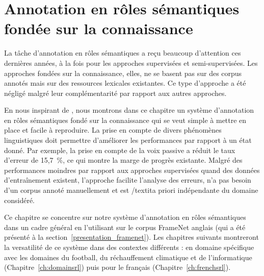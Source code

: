 \chapter{Annotation en rôles sémantiques fondée sur la connaissance}
\label{ch:srl}




La tâche d'annotation en rôles sémantiques a reçu beaucoup d'attention ces
dernières années, à la fois pour les approches supervisées et semi-supervisées.
Les approches fondées sur la connaissance, elles, ne se basent pas sur des
corpus annotés mais sur des ressources lexicales existantes. Ce type d'approche
a été négligé malgré leur complémentarité par rapport aux autres approches.

En nous inspirant de \citep{swier2004unsupervised,swier2005exploiting}, nous
montrons dans ce chapitre un système d'annotation en rôles sémantiques fondé
sur la connaissance qui se veut simple à mettre en place et facile à
reproduire. La prise en compte de divers phénomènes linguistiques doit
permettre d'améliorer les performances par rapport à un état donné. Par
exemple, la prise en compte de la voix passive a réduit le taux d'erreur de
15,7~\%, ce qui montre la marge de progrès existante. Malgré des performances
moindres par rapport aux approches supervisées quand des données d'entraînement
existent, l'approche facilite l'analyse des erreurs, n'a pas besoin d'un corpus
annoté manuellement et est /textit{a priori} indépendante du domaine considéré.

Ce chapitre se concentre sur notre système d'annotation en rôles sémantiques
dans un cadre général en l'utilisant sur le corpus FrameNet anglais (qui a été
présenté à la section~\ref{presentation_framenet}). Les chapitres suivants
montreront la versatilité de ce système dans des contextes différents : en
domaine spécifique avec les domaines du football, du réchauffement climatique
et de l'informatique (Chapitre~\ref{ch:domainsrl}) puis pour le français
(Chapitre~\ref{ch:frenchsrl}).


